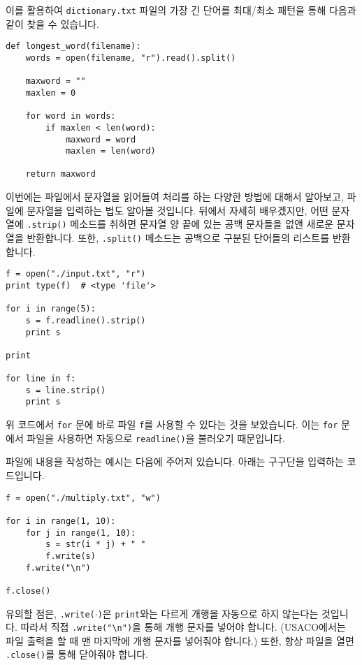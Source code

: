 \documentclass[../main.tex]{subfiles}
\begin{document}
이를 활용하여 \texttt{dictionary.txt} 파일의 가장 긴 단어를 최대/최소 패턴을 통해 다음과 같이 찾을 수 있습니다.
\begin{verbatim}
def longest_word(filename):
    words = open(filename, "r").read().split()
    
    maxword = ""
    maxlen = 0
    
    for word in words:
        if maxlen < len(word):
            maxword = word
            maxlen = len(word)

    return maxword
\end{verbatim}

이번에는 파일에서 문자열을 읽어들여 처리를 하는 다양한 방법에 대해서 알아보고, 파일에 문자열을 입력하는 법도 알아볼 것입니다.
뒤에서 자세히 배우겠지만, 어떤 문자열에 \texttt{.strip()} 메소드를 취하면 문자열 양 끝에 있는 공백 문자들을 없앤 새로운 문자열을 반환합니다.
또한, \texttt{.split()} 메소드는 공백으로 구분된 단어들의 리스트를 반환합니다.
\begin{verbatim}
f = open("./input.txt", "r")
print type(f)  # <type 'file'>

for i in range(5):
    s = f.readline().strip()
    print s

print

for line in f:
    s = line.strip()
    print s
\end{verbatim}
위 코드에서 \texttt{for} 문에 바로 파일 \texttt{f}를 사용할 수 있다는 것을 보았습니다.
이는 \texttt{for} 문에서 파일을 사용하면 자동으로 \texttt{readline()}을 불러오기 때문입니다.

파일에 내용을 작성하는 예시는 다음에 주어져 있습니다.
아래는 구구단을 입력하는 코드입니다.
\begin{verbatim}
f = open("./multiply.txt", "w")

for i in range(1, 10):
    for j in range(1, 10):
        s = str(i * j) + " "
        f.write(s)
    f.write("\n")

f.close()
\end{verbatim}
유의할 점은, \texttt{.write($\cdot$)}은 \texttt{print}와는 다르게 개행을 자동으로 하지 않는다는 것입니다.
따라서 직접 \texttt{.write("\textbackslash n")}을 통해 개행 문자를 넣어야 합니다.
(USACO에서는 파일 출력을 할 때 맨 마지막에 개행 문자를 넣어줘야 합니다.)
또한, 항상 파일을 열면 \texttt{.close()}를 통해 닫아줘야 합니다.
\end{document}
